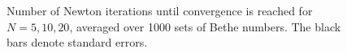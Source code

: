 \documentclass[11pt, a4paper]{report} %
\begin{document}
\begin{figure}[ph]
  \centering
  \\
  \\
  \caption{Number of Newton iterations until convergence is reached for \(N=5,10,20\), averaged over 1000 sets of Bethe numbers. The black bars denote standard errors.}
  \label{fig:iterations}
\end{figure}
\end{document}
